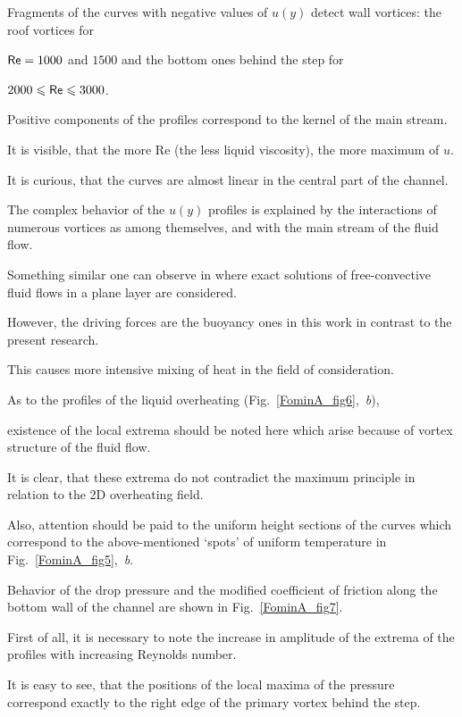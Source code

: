 Fragments of the curves with negative values of $u (y)$ detect wall vortices: the roof vortices for 

${\sf Re} = 1000$ and $1500$ and the bottom ones behind the step for 

$2000 \leqslant {\sf Re} \leqslant 3000$. 

Positive components of the profiles correspond to the kernel of the main stream.  

It is visible, that the more {\sf Re} (the less liquid viscosity), the more maximum of $u$. 

It is curious, that the curves are almost linear in the central part of the channel.



The complex behavior of the $u(y)$ profiles is explained by the interactions of numerous vortices as among themselves, and with the main stream of the fluid flow. 

Something similar one can observe in \cite{Vlasova} where exact solutions of free-convective fluid flows in a plane layer are considered. 

However, the driving forces are the buoyancy ones in this work in contrast to the present research. 

This causes more intensive mixing of heat in the field of consideration. 



As to the profiles of the liquid overheating (Fig.~\ref{FominA_fig6},~{\textsl b}\/), 

existence of the local extrema should be noted here which arise because of vortex structure of the fluid flow. 

It is clear, that these extrema do not contradict the maximum principle in relation to the 2D overheating field. 

Also, attention should be paid to the uniform height sections of the curves which correspond to the above-mentioned `spots' of uniform temperature in Fig.~\ref{FominA_fig5},~{\textsl b}.





Behavior of the drop pressure and the modified coefficient of friction along the bottom wall of the channel are shown in Fig.~\ref{FominA_fig7}. 

First of all, it is necessary to note the increase in amplitude of the extrema of the profiles with increasing Reynolds number. 

It is easy to see, that the positions of the local maxima of the pressure correspond exactly to the right edge of the primary vortex behind the step.  

